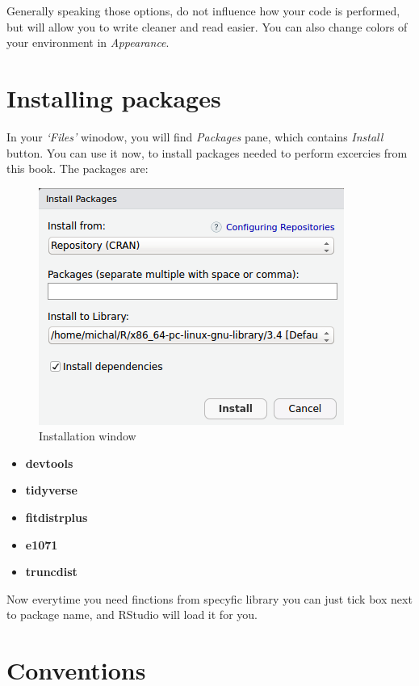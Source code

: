 \documentclass[]{book}
\providecommand{\tightlist}{%
  \setlength{\itemsep}{0pt}\setlength{\parskip}{0pt}}
\theoremstyle{definition}
\theoremstyle{definition}
\theoremstyle{definition}
\theoremstyle{remark}
\begin{document}
Generally speaking those options, do not influence how your code is
performed, but will allow you to write cleaner and read easier. You can
also change colors of your environment in \emph{Appearance}.

\section{Installing packages}\label{installing-packages}

In your \emph{`Files'} winodow, you will find \emph{Packages} pane,
which contains \emph{Install} button. You can use it now, to install
packages needed to perform excercies from this book. The packages are:

\begin{figure}

{\centering \includegraphics[width=0.5\linewidth]{instalPacks} 

}

\caption{Installation window}\label{fig:install-packs}
\end{figure}

\begin{itemize}
\tightlist
\item
  \textbf{devtools} \citep{R-devtools}
\item
  \textbf{tidyverse} \citep{R-dplyr}
\item
  \textbf{fitdistrplus} \citep{R-fitdistrplus}
\item
  \textbf{e1071} \citep{R-e1071}
\item
  \textbf{truncdist} \citep{R-truncdist}
\end{itemize}

Now everytime you need finctions from specyfic library you can just tick
box next to package name, and RStudio will load it for you.

\section{Conventions}\label{conventions}
\end{document}
